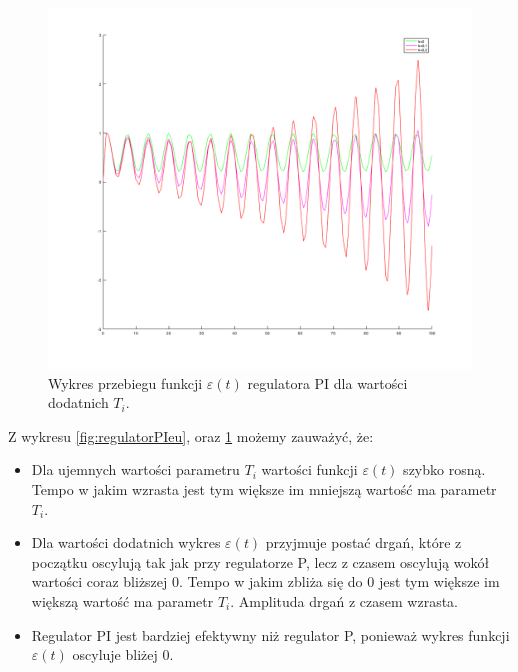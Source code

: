 \documentclass[a4paper,10pt]{article}
\begin{document}
\begin{figure}[!h]
    \centering
	\includegraphics[width=130mm]{PI-kd.png}
	\caption{Wykres przebiegu funkcji $\varepsilon(t)$ regulatora PI dla wartości dodatnich $T_{i}$.}
    \label{fig:regulatorPIed}
\end{figure}
\newpage Z wykresu \ref{fig:regulatorPIeu}, oraz \ref{fig:regulatorPIed} możemy zauważyć, że:
\begin{itemize}
	\item Dla ujemnych wartości parametru $T_{i}$ wartości funkcji $\varepsilon(t)$ szybko rosną. Tempo w jakim wzrasta jest tym większe im mniejszą wartość ma parametr $T_{i}$.
	\item Dla wartości dodatnich wykres $\varepsilon(t)$ przyjmuje postać drgań, które z początku oscylują tak jak przy regulatorze P, lecz z czasem oscylują wokół wartości coraz bliższej 0. Tempo w jakim zbliża się do 0 jest tym większe im większą wartość ma parametr $T_{i}$. Amplituda drgań z czasem wzrasta.
	\item Regulator PI jest bardziej efektywny niż regulator P, ponieważ wykres funkcji $\varepsilon(t)$ oscyluje bliżej 0.
\end{itemize}
\end{document}
